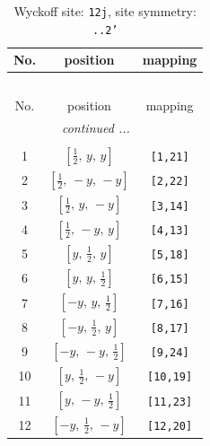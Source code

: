 \documentclass[fleqn,8pt]{jsarticle}
\begin{document}
\begin{longtable}{ccc}
\caption{Wyckoff site: {\tt 12j}, site symmetry: {\tt ..2'}}
 \\
 \hline \hline
No. & position & mapping \\ \hline \endfirsthead

\multicolumn{2}{l}{\tablename\ \thetable{}} \\
 \hline \hline
No. & position & mapping \\ \hline \endhead

 \hline \hline
\multicolumn{2}{r}{\footnotesize\it continued ...} \\ \endfoot

 \hline \hline
\multicolumn{2}{r}{} \\ \endlastfoot

1 & $\left[ \frac{1}{2},\, y,\, y \right]$ & {\tt [1,21]} \\ \hline
2 & $\left[ \frac{1}{2},\, - y,\, - y \right]$ & {\tt [2,22]} \\ \hline
3 & $\left[ \frac{1}{2},\, y,\, - y \right]$ & {\tt [3,14]} \\ \hline
4 & $\left[ \frac{1}{2},\, - y,\, y \right]$ & {\tt [4,13]} \\ \hline
5 & $\left[ y,\, \frac{1}{2},\, y \right]$ & {\tt [5,18]} \\ \hline
6 & $\left[ y,\, y,\, \frac{1}{2} \right]$ & {\tt [6,15]} \\ \hline
7 & $\left[ - y,\, y,\, \frac{1}{2} \right]$ & {\tt [7,16]} \\ \hline
8 & $\left[ - y,\, \frac{1}{2},\, y \right]$ & {\tt [8,17]} \\ \hline
9 & $\left[ - y,\, - y,\, \frac{1}{2} \right]$ & {\tt [9,24]} \\ \hline
10 & $\left[ y,\, \frac{1}{2},\, - y \right]$ & {\tt [10,19]} \\ \hline
11 & $\left[ y,\, - y,\, \frac{1}{2} \right]$ & {\tt [11,23]} \\ \hline
12 & $\left[ - y,\, \frac{1}{2},\, - y \right]$ & {\tt [12,20]} \\
\end{longtable}
\renewcommand{\arraystretch}{1.2}
\end{document}
